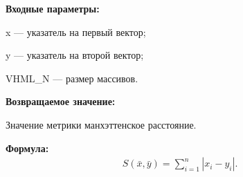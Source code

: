 \textbf{Входные параметры:}
 
x --- указатель на первый вектор;
 
y --- указатель на второй вектор;
 
VHML\_N --- размер массивов.

\textbf{Возвращаемое значение:}
 
Значение метрики манхэттенское расстояние.

\textbf{Формула:}
\begin{eqnarray*}
S\left( \bar{x}, \bar{y}\right)=\sum_{i=1}^n \left|x_i-y_i \right|  .
\end{eqnarray*}